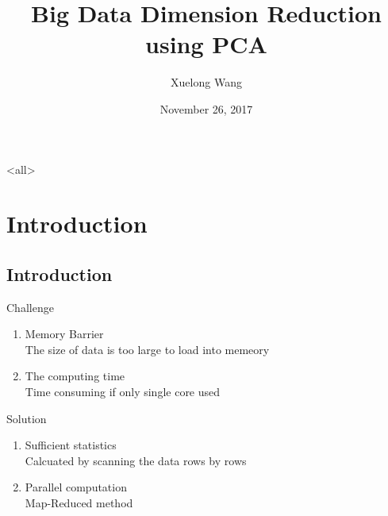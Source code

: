 \documentclass[ignorenonframetext,]{beamer}
\author[
Xuelong Wang
]{Xuelong Wang}
\date[
11/26/2017
]{
November 26, 2017
}
\begin{document}
\mode<all>{
\title[
Missing ``\texttt{short-title}'' field!
]{
Big Data Dimension Reduction using PCA
}
}
\mode*

\frame{\titlepage}

\begin{frame}
\tableofcontents[hideallsubsections]
\end{frame}

\section{Introduction}\label{introduction}

\subsection{Introduction}\label{introduction-1}

\begin{frame}{Challenge}

\begin{enumerate}
\def\labelenumi{\arabic{enumi}.}
\item
  Memory Barrier\\
  The size of data is too large to load into memeory
\item
  The computing time\\
  Time consuming if only single core used
\end{enumerate}

\end{frame}

\begin{frame}{Solution}

\begin{enumerate}
\def\labelenumi{\arabic{enumi}.}
\item
  Sufficient statistics\\
  Calcuated by scanning the data rows by rows
\item
  Parallel computation\\
  Map-Reduced method
\end{enumerate}

\end{frame}
\end{document}
